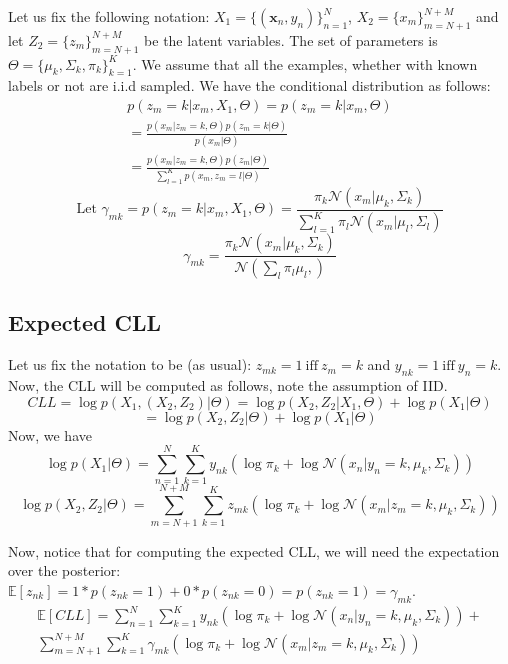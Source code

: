 \documentclass[a4paper,11pt]{article}
\begin{document}
\begin{mlsolution}
Let us fix the following notation: $X_1 = \{(\textbf{x}_n, y_n)\}^{N}_{n=1}$, $X_2 = \{x_m\}^{N+M}_{m=N+1}$ and let $Z_2 = \{z_m\}^{N+M}_{m=N+1}$ be the latent variables. The set of parameters is $\Theta = \{\mu_k,\Sigma_{k}, \pi_{k} \}^{K}_{k=1}$. We assume that all the examples, whether with known labels or not are i.i.d sampled. We have the conditional distribution as follows:
\begin{eqnarray}
p(z_m = k| x_m, X_1, \Theta) = p(z_m = k| x_m, \Theta)  \\ =  \frac{p(x_m|z_m = k, \Theta)p(z_m = k|\Theta)}{p(x_m| \Theta)} \\ = \frac{p(x_m|z_m = k, \Theta)p(z_m|\Theta)}{\sum_{l=1}^{K}p(x_m, z_m = l|\Theta)}
\end{eqnarray}
\[
\text{Let } \gamma_{mk} = p(z_m = k| x_m, X_1, \Theta) = \frac{\pi_{k}\mathcal{N}(x_m| \mu_k, \Sigma_k)}{\sum_{l=1}^{K}\pi_{l}\mathcal{N}(x_m| \mu_l, \Sigma_l)}
\]
\begin{equation}
\label{eq4}
\boxed{\gamma_{mk}  = \frac{\pi_{k}\mathcal{N}(x_m| \mu_k, \Sigma_k)}{\mathcal{N}\left( \sum_{l}\pi_{l}\mu_{l},   \right) }}
\end{equation}

\subsection{Expected CLL}
Let us fix the notation to be (as usual): $z_{mk} = 1 \ \text{iff} \  z_m = k$ and  $y_{nk} = 1 \ \text{iff} \ y_n = k$. Now, the CLL will be computed as follows, note the assumption of IID.
\[
CLL = \log p(X_1, (X_2, Z_2) | \Theta) = \log p(X_2, Z_2|X_1, \Theta) + \log p(X_1|\Theta) 
\]
\[= \log p(X_2, Z_2 |\Theta) + \log p(X_1| \Theta)
\]
Now, we have
\[
\log p(X_1| \Theta) = \sum_{n=1}^{N}\sum_{k=1}^{K}y_{nk}\left( \log \pi_k + \log \mathcal{N}(x_n| y_n = k, \mu_k, \Sigma_k) \right)
\]
\[
\log p(X_2, Z_2 |\Theta) = \sum_{m=N+1}^{N+M}\sum_{k=1}^{K}z_{mk}\left( \log \pi_k + \log \mathcal{N}(x_m| z_m = k, \mu_k, \Sigma_k)  \right)
\]

Now, notice that  for computing the expected CLL, we will need the expectation over the posterior: $\mathbb{E}[z_{nk}] = 1*p(z_{nk}=1) + 0*p(z_{nk}=0) = p(z_{nk}=1) = \gamma_{mk}$. 
\begin{eqnarray}
\label{eq5}
\mathbb{E}[CLL] = \sum_{n=1}^{N}\sum_{k=1}^{K}y_{nk}\left( \log \pi_k + \log \mathcal{N}(x_n| y_n = k, \mu_k, \Sigma_k) \right) + \\ \sum_{m=N+1}^{N+M}\sum_{k=1}^{K}\gamma_{mk}\left( \log \pi_k + \log \mathcal{N}(x_m| z_m = k, \mu_k, \Sigma_k)  \right)
\end{eqnarray}


\end{mlsolution}
\end{document}
